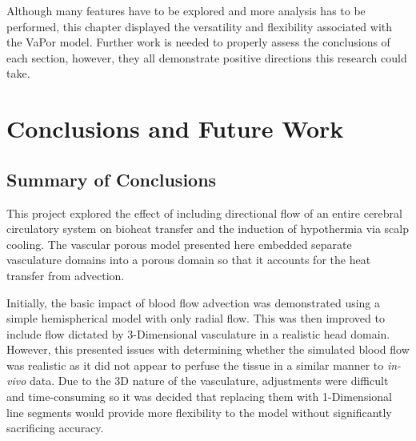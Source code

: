 \documentclass[11pt,english,a4paper,twoside,openright]{report}
\begin{document}
{{{{{{{Although many features have to be explored and more analysis has to be performed, this chapter displayed the versatility and flexibility associated with the VaPor model. Further work is needed to properly assess the conclusions of each section, however, they all demonstrate positive directions this research could take. 

\newpage
\thispagestyle{empty}
\chapter[Conclusions and Future Work]{{\Huge C}onclusions and {\Huge F}uture {\Huge W}ork}
\thispagestyle{empty}
\label{Sec:6Chapter6}

\section[Summary of Conclusions]{{\Large S}ummary of {\Large C}onclusions}
This project explored the effect of including directional flow of an entire cerebral circulatory system on bioheat transfer and the induction of hypothermia via scalp cooling. The vascular porous model presented here embedded separate vasculature domains into a porous domain so that it accounts for the heat transfer from advection.

Initially, the basic impact of blood flow advection was demonstrated using a simple hemispherical model with only radial flow. This was then improved to include flow dictated by 3-Dimensional vasculature in a realistic head domain. However, this presented issues with determining whether the simulated blood flow was realistic as it did not appear to perfuse the tissue in a similar manner to \textit{in-vivo} data. Due to the 3D nature of the vasculature, adjustments were difficult and time-consuming so it was decided that replacing them with 1-Dimensional line segments would provide more flexibility to the model without significantly sacrificing accuracy.

}}}}}}}
\end{document}
